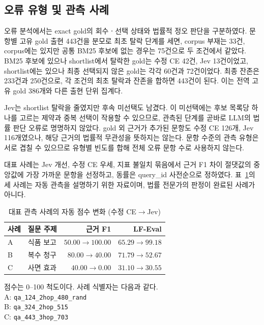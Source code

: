 \subsection{오류 유형 및 관측 사례}
\label{sec:ch4_errors}

오류 분석에서는 exact gold의 회수ㆍ선택 상태와 법률적 정오 판단을
구분하였다. 문항별 고유 gold 출현 443건을 분모로 최초 탈락 단계를
세면, corpus 부재는 33건, corpus에는 있지만 공통 BM25 후보에 없는
경우는 75건으로 두 조건에서 같았다. BM25 후보에 있으나 shortlist에서
탈락한 gold는 수정 CE 42건, Jev 13건이었고, shortlist에는 있으나
최종 선택되지 않은 gold는 각각 60건과 72건이었다.
최종 잔존은 233건과 250건으로, 각 조건의 최초 탈락과 잔존을 합하면
443건이 된다. 이는 전역 고유 gold 386개와 다른 출현 단위 집계다.

Jev는 shortlist 탈락을 줄였지만 후속 미선택도 남겼다.
이 미선택에는 후보 목록당 하나를 고르는 제약과 중복 선택이 작용할 수
있으므로, 관측된 단계를 곧바로 LLM의 법률 판단 오류로 명명하지 않았다.
gold 외 근거가 추가된 문항도 수정 CE 126개, Jev 116개였으나,
해당 근거의 법률적 무관성을 뜻하지는 않는다. 문항 수준의 관측 유형은
서로 겹칠 수 있으므로 유형별 빈도를 합해 전체 오류 문항 수로 사용하지 않는다.

대표 사례는 Jev 개선, 수정 CE 우세, 지표 불일치 묶음에서
근거 F1 차이 절댓값의 중앙값에 가장 가까운 문항을 선정하고,
동률은 query\_id 사전순으로 정하였다.
표~\ref{tab:ch4_cases}의 세 사례는 자동 관측을 설명하기 위한 자료이며,
법률 전문가의 판정이 완료된 사례가 아니다.

\begin{table}[htbp]
    \centering
    \caption{대표 관측 사례의 자동 점수 변화 (수정 CE$\to$Jev)}
    \label{tab:ch4_cases}
    \small
    \setlength{\tabcolsep}{4pt}
    \begin{tabular}{@{}llrr@{}}
        \hline
        사례 & 질문 주제 & 근거 F1 & LF-Eval \\
        \hline
        A & 식품 보고 & $50.00\to100.00$ & $65.29\to99.18$ \\
        B & 복수 청구 & $80.00\to40.00$  & $71.79\to52.67$ \\
        C & 사면 효과 & $40.00\to0.00$   & $31.10\to30.55$ \\
        \hline
    \end{tabular}
    \par\smallskip
    \begin{minipage}{\linewidth}
        \footnotesize
        점수는 0--100 척도이다. 사례 식별자는 다음과 같다.\\
        A: \texttt{qa\_124\_2hop\_480\_rand}\\
        B: \texttt{qa\_324\_2hop\_515}\\
        C: \texttt{qa\_443\_3hop\_703}
    \end{minipage}
\end{table}

